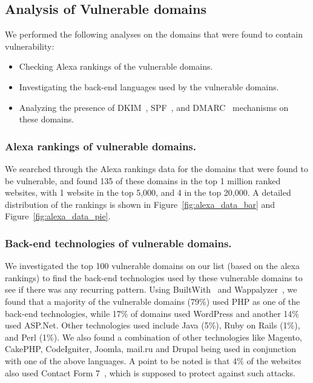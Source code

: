 \subsection{Analysis of Vulnerable domains}

We performed the following analyses on the domains that were found to contain \ehi vulnerability:
\begin{itemize}
	\item Checking Alexa rankings of the vulnerable domains.
	\item Investigating the back-end languages used by the vulnerable domains.
	\item Analyzing the presence of DKIM~\cite{allman2007domainkeys}, SPF~\cite{schlitt2006sender}, and DMARC~\cite{kucherawy2015domain} mechanisms on these domains.
\end{itemize}


\subsubsection{Alexa rankings of vulnerable domains.}
We searched through the Alexa rankings data\cite{alexa} for the domains that were found to be vulnerable, and found 135 of these domains in the top 1 million ranked websites, with 1 website in the top 5,000, and 4 in the top 20,000. A detailed distribution of the rankings is shown in Figure~\ref{fig:alexa_data_bar} and Figure~\ref{fig:alexa_data_pie}.




\subsubsection{Back-end technologies of vulnerable domains.}
We investigated the top 100 vulnerable domains on our list (based on the alexa rankings) to find the back-end technologies used by these vulnerable domains to see if there was any recurring pattern. Using BuiltWith~\cite{builtwith} and Wappalyzer~\cite{wappalyzer}, we found that a majority of the vulnerable domains (79\%) used PHP as one of the back-end technologies, while 17\% of domains used WordPress and another 14\% used ASP.Net. Other technologies used include Java (5\%), Ruby on Rails (1\%), and Perl (1\%). We also found a combination of other technologies like Magento, CakePHP, CodeIgniter, Joomla, mail.ru and Drupal being used in conjunction with one of the above languages. A point to be noted is that 4\% of the websites also used Contact Form 7~\cite{CF7}, which is supposed to protect against such attacks.

